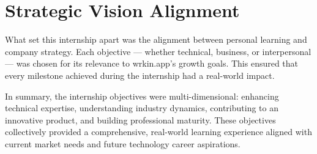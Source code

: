 \section{Strategic Vision Alignment}

What set this internship apart was the alignment between personal learning and company strategy. Each objective — whether technical, business, or interpersonal — was chosen for its relevance to wrkin.app's growth goals. This ensured that every milestone achieved during the internship had a real-world impact.

In summary, the internship objectives were multi-dimensional: enhancing technical expertise, understanding industry dynamics, contributing to an innovative product, and building professional maturity. These objectives collectively provided a comprehensive, real-world learning experience aligned with current market needs and future technology career aspirations.

